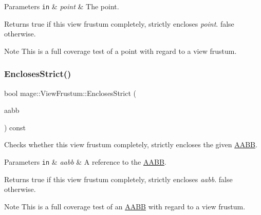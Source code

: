 \begin{DoxyParams}[1]{Parameters}
\mbox{\tt in}  & {\em point} & The point. \\
\hline
\end{DoxyParams}
\begin{DoxyReturn}{Returns}
{\ttfamily true} if this view frustum completely, strictly encloses {\itshape point}. {\ttfamily false} otherwise. 
\end{DoxyReturn}
\begin{DoxyNote}{Note}
This is a full coverage test of a point with regard to a view frustum. 
\end{DoxyNote}
\hypertarget{structmage_1_1_view_frustum_a7a0d293c4f3d1f29c54f45f00a7ca51f}{}\label{structmage_1_1_view_frustum_a7a0d293c4f3d1f29c54f45f00a7ca51f} 
\subsubsection{\texorpdfstring{Encloses\+Strict()}{EnclosesStrict()}\hspace{0.1cm}{\footnotesize\ttfamily [3/4]}}
{\footnotesize\ttfamily bool mage\+::\+View\+Frustum\+::\+Encloses\+Strict (\begin{DoxyParamCaption}\item[{const \hyperlink{structmage_1_1_a_a_b_b}{A\+A\+BB} \&}]{aabb }\end{DoxyParamCaption}) const\hspace{0.3cm}{\ttfamily [noexcept]}}

Checks whether this view frustum completely, strictly encloses the given \hyperlink{structmage_1_1_a_a_b_b}{A\+A\+BB}.


\begin{DoxyParams}[1]{Parameters}
\mbox{\tt in}  & {\em aabb} & A reference to the \hyperlink{structmage_1_1_a_a_b_b}{A\+A\+BB}. \\
\hline
\end{DoxyParams}
\begin{DoxyReturn}{Returns}
{\ttfamily true} if this view frustum completely, strictly encloses {\itshape aabb}. {\ttfamily false} otherwise. 
\end{DoxyReturn}
\begin{DoxyNote}{Note}
This is a full coverage test of an \hyperlink{structmage_1_1_a_a_b_b}{A\+A\+BB} with regard to a view frustum. 
\end{DoxyNote}
\hypertarget{structmage_1_1_view_frustum_a4300cf7690bc650ca521283496394997}{}\label{structmage_1_1_view_frustum_a4300cf7690bc650ca521283496394997} 
